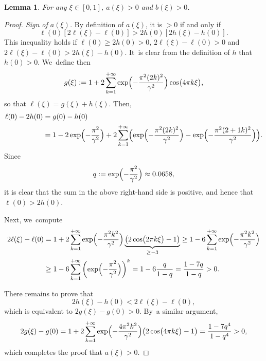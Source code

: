 \documentclass[10pt]{amsart}
\newtheorem{lemme}[theorem]{Lemma}
\theoremstyle{definition}
\let\EE\exp
\newcommand{\pa}[1]{\left(#1\right)}
\newcommand{\Bpa}[1]{\Bigl(#1\Bigr)}
\newcommand{\pac}[1]{\left[#1\right]}
\begin{document}
\begin{lemme} For any $\xi \in [0,1]$, $a(\xi) > 0$ and $b(\xi)>0$.
\end{lemme}

\begin{proof}[Proof. Sign of $a(\xi)$] By definition of $a(\xi)$, it is $>0$ if and only if
\[
\ell(0)\pac{2\ell(\xi)-\ell(0)} > 2h(0)\pac{2h(\xi)-h(0)}.
\]
This inequality holds if $\ell(0) \geq 2h(0) >0$, $2\ell(\xi)-\ell(0) > 0$ and $2\ell(\xi)-\ell(0) > 2h(\xi)-h(0)$. It~is clear from the definition of $h$ that $h(0) > 0$. We~define then
\[
g(\xi):= 1 + 2 \sum_{k=1}^{+\infty}\EE\Bigl({-\frac{\pi^2(2k)^2}{\gamma^2}}\Bigr) \cos\bigl({4\pi k\xi}\bigr),
\]
so that $\ell(\xi) = g(\xi) + h(\xi)$. Then,
\begin{align*}
\ell(0) - 2h(0) &= g(0) - h(0)\\
&= 1-2\EE\Bigl(-\frac{\pi^2}{\gamma^2}\Bigr) + 2\sum_{k=1}^{+\infty}\Bpa{\EE\Bigl({-\frac{\pi^2(2k)^2}{\gamma^2}}\Bigr)-\EE\Bigl({-\frac{\pi^2(2+1k)^2}{\gamma^2}}\Bigr)}.
\end{align*}
Since
\[
q:= \EE\Bigl(-\frac{\pi^2}{\gamma^2}\Bigr) \approx 0.0658,
\]
it is clear that the sum in the above right-hand side is positive, and hence that $\ell(0) > 2 h(0)$.

Next, we~compute
\begin{align*}
2\ell(\xi) - \ell(0) &= 1 + 2 \sum_{k=1}^{+\infty} \EE\Bigl({-\frac{\pi^2k^2}{\gamma^2}}\Bigr)\underbrace{\pa{2\cos\bigl({2\pi k \xi}\bigr)-1}}_{\geq -3} \geq 1 - 6\sum_{k=1}^{+\infty}\EE\Bigl({-\frac{\pi^2k^2}{\gamma^2}}\Bigr) \\
& \geq 1 - 6\sum_{k=1}^{+\infty}\pa{ \EE\Bigl(-\frac{\pi^2}{\gamma^2} \Bigr) }^k = 1 - 6\frac{q}{1-q} = \frac{1-7q}{1-q} > 0.
\end{align*}

There remains to prove that
\[
2h(\xi)-h(0) < 2\ell(\xi)-\ell(0),
\]
which is equivalent to $2g(\xi)-g(0) > 0$. By~a similar argument,
\[
2g(\xi) - g(0) = 1 + 2 \sum_{k=1}^{+\infty} \EE\Bigl(-\frac{4\pi^2k^2}{\gamma^2}\Bigr) \bigl({2\cos\bigl(4\pi k \xi \bigr)-1}\bigr) = \frac{1-7q^4}{1-q^4}> 0,
\]
which completes the proof that $a(\xi) > 0$.


\end{proof}
\end{document}
